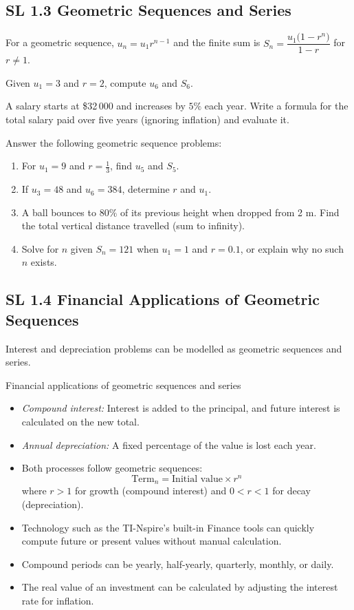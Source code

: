 \documentclass[11pt]{article}
\def\textbf#1{#1}%
\def\texttt#1{#1}%
\def\SI#1#2{#1 #2}%
\newcommand{\tocsubsection}[1]{\subsection{#1}}
\newcounter{question}
\begin{document}
\tocsubsection{SL  1.3  \; Geometric  Sequences  and  Series}
For a geometric sequence, $u_n=u_1r^{n-1}$ and the finite sum is
$S_n=\dfrac{u_1\bigl(1-r^{n}\bigr)}{1-r}$ for $r\neq1$.

\begin{question}
Given $u_1=3$ and $r=2$, compute $u_6$ and $S_6$.
\end{question}

\begin{question}
A salary starts at \$32\,000 and increases by $5\%$ each year.  Write a formula
for the total salary paid over five years (ignoring inflation) and evaluate it.
\end{question}

\begin{question}
Answer the following geometric sequence problems:
\begin{enumerate}[label=\alph*)]
\item For $u_1=9$ and $r=\tfrac{1}{3}$, find $u_5$ and $S_5$.
\item If $u_3=48$ and $u_6=384$, determine $r$ and $u_1$.
\item A ball bounces to $80\%$ of its previous height when dropped from
\SI{2}{m}.  Find the total vertical distance travelled (sum to infinity).
\item Solve for $n$ given $S_n=121$ when $u_1=1$ and $r=0.1$, or explain why no such $n$ exists.
\end{enumerate}
\end{question}

\tocsubsection{SL  1.4  \; Financial  Applications  of  Geometric  Sequences}
Interest and depreciation problems can be modelled as geometric sequences and
series.


\begin{keyideas}
\textbf{Financial applications of geometric sequences and series}
\begin{itemize}[itemsep=2pt]
  \item \emph{Compound interest:} Interest is added to the principal, and future interest is calculated on the new total.
  \item \emph{Annual depreciation:} A fixed percentage of the value is lost each year.
  \item Both processes follow geometric sequences: 
        \[
          \text{Term}_n = \text{Initial value} \times r^{n}
        \]
        where \(r>1\) for growth (compound interest) and \(0<r<1\) for decay (depreciation).
  \item Technology such as the TI-Nspire’s built-in \texttt{Finance} tools can quickly compute future or present values without manual calculation.
  \item Compound periods can be yearly, half-yearly, quarterly, monthly, or daily. 
  \item The real value of an investment can be calculated by adjusting the interest rate for inflation.
\end{itemize}
\end{keyideas}
\end{document}
